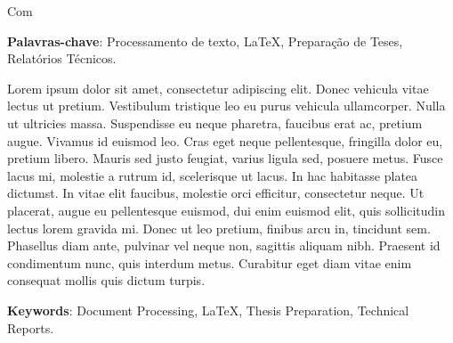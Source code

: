 %
%

Com 


\vspace{1.5ex}

{\bf Palavras-chave}: Processamento de texto, \LaTeX,
Preparação de Teses, Relatórios Técnicos.

%
%

Lorem ipsum dolor sit amet, consectetur adipiscing elit. Donec vehicula vitae lectus ut pretium. Vestibulum tristique leo eu purus vehicula ullamcorper. Nulla ut ultricies massa. Suspendisse eu neque pharetra, faucibus erat ac, pretium augue. Vivamus id euismod leo. Cras eget neque pellentesque, fringilla dolor eu, pretium libero. Mauris sed justo feugiat, varius ligula sed, posuere metus. Fusce lacus mi, molestie a rutrum id, scelerisque ut lacus. In hac habitasse platea dictumst. In vitae elit faucibus, molestie orci efficitur, consectetur neque. Ut placerat, augue eu pellentesque euismod, dui enim euismod elit, quis sollicitudin lectus lorem gravida mi. Donec ut leo pretium, finibus arcu in, tincidunt sem. Phasellus diam ante, pulvinar vel neque non, sagittis aliquam nibh. Praesent id condimentum nunc, quis interdum metus. Curabitur eget diam vitae enim consequat mollis quis dictum turpis.

\vspace{1.5ex}

{\bf Keywords}: Document Processing, \LaTeX, Thesis Preparation,
Technical Reports.
